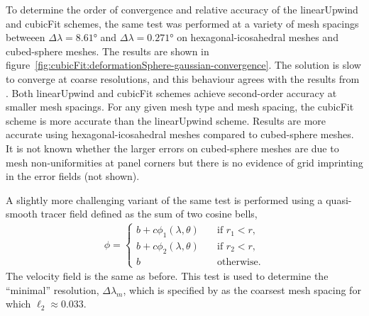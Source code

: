 To determine the order of convergence and relative accuracy of the linearUpwind and cubicFit schemes, the same test was performed at a variety of mesh spacings betweeen $\Delta \lambda = \ang{8.61}$ and $\Delta \lambda = \ang{0.271}$ on hexagonal-icosahedral meshes and cubed-sphere meshes.  The results are shown in figure~\ref{fig:cubicFit:deformationSphere-gaussian-convergence}.
The solution is slow to converge at coarse resolutions, and this behaviour agrees with the results from \citet{lauritzen2012}.  Both linearUpwind and cubicFit schemes achieve second-order accuracy at smaller mesh spacings. 
For any given mesh type and mesh spacing, the cubicFit scheme is more accurate than the linearUpwind scheme.
Results are more accurate using hexagonal-icosahedral meshes compared to cubed-sphere meshes.  It is not known whether the larger errors on cubed-sphere meshes are due to mesh non-uniformities at panel corners but there is no evidence of grid imprinting in the error fields (not shown).

A slightly more challenging variant of the same test is performed using a quasi-smooth tracer field defined as the sum of two cosine bells,
\begin{align}
	\phi =
	\begin{cases}
		b + c \phi_1(\lambda, \theta) & \quad \text{if $r_1 < r$,} \\
		b + c \phi_2(\lambda, \theta) & \quad \text{if $r_2 < r$,} \\
		b			      & \quad \text{otherwise.}
	\end{cases}
\end{align}
The velocity field is the same as before.  This test is used to determine the ``minimal'' resolution, $\Delta \lambda_m$, which is specified by \citet{lauritzen2012} as the coarsest mesh spacing for which $\ell_2 \approx 0.033$.

